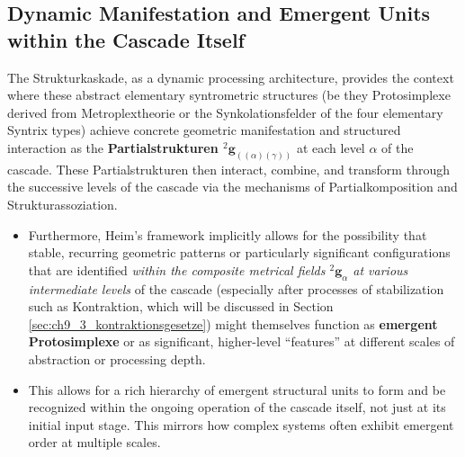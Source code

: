 \documentclass[
    12pt,              %
    a4paper,           %
    headings=normal,   %
    twoside=true,      %
    BCOR=8mm,          %
]{scrbook}
\newcommand{\q}[1]{\enquote{#1}}
\newcommand{\kompositionsfeld}{{}^2\mathbf{g}}
\newcommand{\partialstruktur}[1]{{}^2\mathbf{g}_{(#1)}}
\newcommand{\kaskadenstufe}{\alpha}
\begin{document}
\subsection{Dynamic Manifestation and Emergent Units within the Cascade Itself}
\label{sec:ch9_2_3_dynamic_manifestation_emergent_units}
The Strukturkaskade, as a dynamic processing architecture, provides the context where these abstract elementary syntrometric structures (be they Protosimplexe derived from Metroplextheorie or the Synkolationsfelder of the four elementary Syntrix types) achieve concrete geometric manifestation and structured interaction as the \textbf{Partialstrukturen \(\partialstruktur{(\alpha)(\gamma)}\)} at each level \(\kaskadenstufe\) of the cascade. These Partialstrukturen then interact, combine, and transform through the successive levels of the cascade via the mechanisms of Partialkomposition and Strukturassoziation.
\begin{itemize}
    \item   Furthermore, Heim’s framework implicitly allows for the possibility that stable, recurring geometric patterns or particularly significant configurations that are identified \textit{within the composite metrical fields \(\kompositionsfeld_\alpha\) at various intermediate levels} of the cascade (especially after processes of stabilization such as Kontraktion, which will be discussed in Section \ref{sec:ch9_3_kontraktionsgesetze}) might themselves function as \textbf{emergent Protosimplexe} or as significant, higher-level \q{features} at different scales of abstraction or processing depth.
    \item   This allows for a rich hierarchy of emergent structural units to form and be recognized within the ongoing operation of the cascade itself, not just at its initial input stage. This mirrors how complex systems often exhibit emergent order at multiple scales.
\end{itemize}
\end{document}
